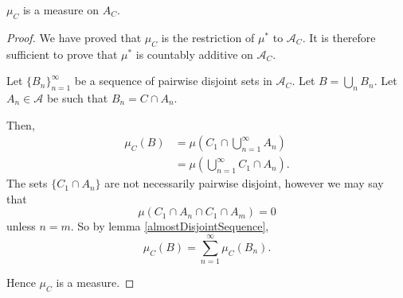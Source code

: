 \documentclass{unswmaths}
\begin{document}
\begin{corollary}
    $\mu_C$ is a measure on $A_C$.
\end{corollary}
\begin{proof}
    We have proved that $\mu_C$ is the restriction of $\mu^*$
    to $\mathcal{A}_C$. It is therefore sufficient
    to prove that $\mu^*$ is countably additive on $\mathcal{A}_C$. 
    
    Let $\{B_n\}_{n=1}^\infty$ be a sequence of pairwise disjoint sets
    in $\mathcal{A}_C$. Let $B = \bigcup_n B_n$. Let $A_n \in \mathcal{A}$
    be such that $B_n = C\cap A_n$.
    
    Then,
    \begin{align*}
        \mu_C(B) &= \mu(C_1\cap\bigcup_{n=1}^\infty A_n)\\
        &= \mu(\bigcup_{n=1}^\infty C_1\cap A_n).
    \end{align*}
    The sets $\{C_1\cap A_n\}$ are not necessarily pairwise disjoint, however
    we may say that
    \begin{equation*}
        \mu(C_1\cap A_n \cap C_1\cap A_m) = 0
    \end{equation*}
    unless $n = m$.
    So by lemma \ref{almostDisjointSequence}, 
    \begin{equation*}
        \mu_C(B) = \sum_{n=1}^\infty \mu_C(B_n).
    \end{equation*}
    
    Hence $\mu_C$ is a measure.
    
%    
%    
    
\end{proof}
\end{document}
